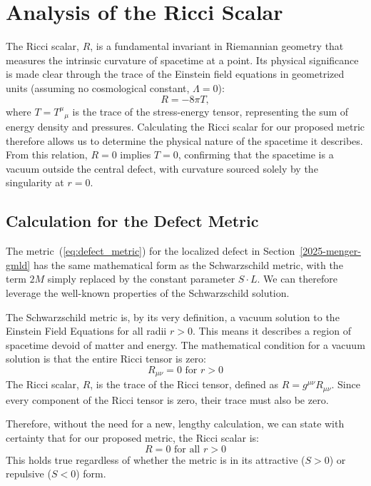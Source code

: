 \documentclass[%
  reprint,
  superscriptaddress,
  showpacs,
  showkeys,
  amsmath,amssymb,
  pra,
  longbibliography,
  floatfix,
]{revtex4-2}
\begin{document}
\section{Analysis of the Ricci Scalar}
\label{sec:ricci}

The Ricci scalar, $R$, is a fundamental invariant in Riemannian geometry that measures the intrinsic curvature of spacetime at a point. Its physical significance is made clear through the trace of the Einstein field equations in geometrized units (assuming no cosmological constant, $\Lambda=0$):
\begin{equation}
    R = -8\pi T,
\end{equation}
where $T = T^\mu{}_\mu$ is the trace of the stress-energy tensor, representing the sum of energy density and pressures. Calculating the Ricci scalar for our proposed metric therefore allows us to determine the physical nature of the spacetime it describes. From this relation, $R=0$ implies $T=0$, confirming that the spacetime is a vacuum outside the central defect, with curvature sourced solely by the singularity at $r=0$.

\subsection{Calculation for the Defect Metric}

The metric~(\ref{eq:defect_metric}) for the localized defect in Section~\ref{2025-menger-gmld}
has the   same mathematical form  as the Schwarzschild metric, with the term $2M$ simply replaced by the constant parameter $S \cdot L$. We can therefore leverage the well-known properties of the Schwarzschild solution.

The Schwarzschild metric is, by its very definition, a {vacuum solution} to the Einstein Field Equations for all radii $r > 0$. This means it describes a region of spacetime devoid of matter and energy. The mathematical condition for a vacuum solution is that the entire Ricci tensor is zero:
\begin{equation}
    R_{\mu\nu} = 0 \text{ for } r > 0
\end{equation}
The Ricci scalar, $R$, is the trace of the Ricci tensor, defined as $R = g^{\mu\nu} R_{\mu\nu}$. Since every component of the Ricci tensor is zero, their trace must also be zero.

Therefore, without the need for a new, lengthy calculation, we can state with certainty that for our proposed metric, the Ricci scalar is:
\begin{equation}
     R = 0  \text{ for all } r > 0
\end{equation}
This holds true regardless of whether the metric is in its attractive ($S>0$) or repulsive ($S<0$) form.
\end{document}
